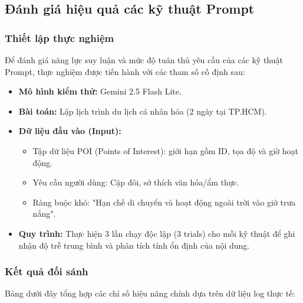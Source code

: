 \subsection{Đánh giá hiệu quả các kỹ thuật Prompt}
\subsubsection{Thiết lập thực nghiệm}

Để đánh giá năng lực suy luận và mức độ tuân thủ yêu cầu của các kỹ thuật Prompt, thực nghiệm được tiến hành với các tham số cố định sau:
\begin{itemize}
    \item \textbf{Mô hình kiểm thử:} Gemini 2.5 Flash Lite.
    \item \textbf{Bài toán:} Lập lịch trình du lịch cá nhân hóa (2 ngày tại TP.HCM).
    \item \textbf{Dữ liệu đầu vào (Input):}
    \begin{itemize}
        \item Tập dữ liệu POI (Points of Interest): giới hạn gồm ID, tọa độ và giờ hoạt động.
        \item Yêu cầu người dùng: Cặp đôi, sở thích văn hóa/ẩm thực.
        \item Ràng buộc khó: "Hạn chế di chuyển và hoạt động ngoài trời vào giờ trưa nắng".
    \end{itemize}
    \item \textbf{Quy trình:} Thực hiện 3 lần chạy độc lập (3 trials) cho mỗi kỹ thuật để ghi nhận độ trễ trung bình và phân tích tính ổn định của nội dung.
\end{itemize}

\subsubsection{Kết quả đối sánh}
Bảng dưới đây tổng hợp các chỉ số hiệu năng chính dựa trên dữ liệu log thực tế:

